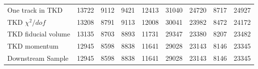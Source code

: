 \begin{landscape}
\begin{table}
\begin{tabular}[pos]{l|cccccccc}
\hline                                            
One track in TKD                                   &   13722  &    9112  &    9421  &   12413  &   31040  &   24720  &    8717  &   24927  \\
TKD $\chi^2/dof$                                   &   13208  &    8791  &    9113  &   12008  &   30041  &   23982  &    8472  &   24172  \\
TKD fiducial volume                                &   13135  &    8703  &    8893  &   11731  &   29347  &   23380  &    8207  &   23482  \\
TKD momentum                                       &   12945  &    8598  &    8838  &   11641  &   29028  &   23143  &    8146  &   23345  \\
\hline                                            
Downstream Sample                                  &   12945  &    8598  &    8838  &   11641  &   29028  &   23143  &    8146  &   23345  \\
\hline                                            

\end{tabular}
\end{table}
\end{landscape}


